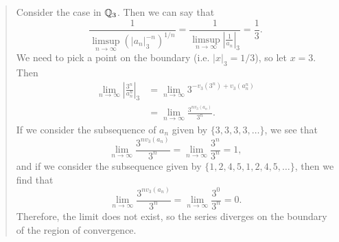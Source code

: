 \documentclass{hw}
\begin{document}
\begin{enumerate}
\begin{quote}
	      	\noindent Consider the case in $\mathbb{Q}_{3}$. Then we can say that
	      	\[
	      		\frac{1}{\limsup_{n\to\infty}\left(\left|a_{n}\right|_{3}^{-n}\right)^{1/n}} =
	      		\frac{1}{\limsup_{n\to\infty}\left|\frac{1}{a_{n}}\right|_{3}} = \frac{1}{3}.
	      	\]
	      	We need to pick a point on the boundary (i.e. $|x|_{3}=1/3$), so let $x=3$. Then
	      	\begin{align*}
	      		\lim_{n\to\infty}\left|\frac{3^{n}}{a_{n}^{n}}\right|_{3}
	      		  & = \lim_{n\to\infty}3^{-v_{3}(3^{n})+v_{3}(a_{n}^{n})} \\
	      		  & = \lim_{n\to\infty}\frac{3^{nv_{3}(a_{n})}}{3^{n}}.
	      	\end{align*}
	      	If we consider the subsequence of $a_{n}$ given by $\{3,3,3,3,\dots\}$, we see that
	      	\[
	      		\lim_{n\to\infty}\frac{3^{nv_{3}(a_{n})}}{3^{n}}=
	      		\lim_{n\to\infty}\frac{3^{n}}{3^{n}}=1,
	      	\]
	      	and if we consider the subsequence given by $\{1,2,4,5,1,2,4,5,\dots\}$, then we find that
	      	\[
	      		\lim_{n\to\infty}\frac{3^{nv_{3}(a_{n})}}{3^{n}}=
	      		\lim_{n\to\infty}\frac{3^{0}}{3^{n}}=0.
	      	\]
	      	Therefore, the limit does not exist, so the series diverges on the boundary of the region of convergence.

	      \end{quote}


\end{enumerate}
\end{document}

